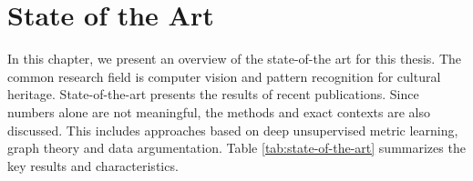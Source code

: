 \chapter{State of the Art}
\label{chap:stateArt}
In this chapter, we present an overview of the state-of-the art for this thesis. The common research field is computer vision and pattern recognition for cultural heritage. State-of-the-art presents the results of recent publications. Since numbers alone are not meaningful, the methods and exact contexts are also discussed. This includes approaches based on deep unsupervised metric learning, graph theory and data argumentation. Table \ref{tab:state-of-the-art} summarizes the key results and characteristics. 

\begin{table}
	\label{tab:state-of-the-art}
\end{table}
